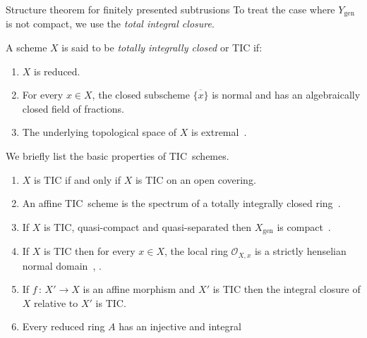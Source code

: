 \documentclass[a4paper,twoside,11pt]{amsart}[2009/07/02] %
\newcommand{\map}[3]{#1\,:\, #2\rightarrow #3}
\newcommand{\Spec}{\mathrm{Spec}}
\newcommand{\genpts}{\mathrm{gen}} %
\newcommand\sO{\mathcal{O}} %
\newcommand{\TIC}{\mathrm{TIC}}
\begin{document}
\begin{section}{Structure theorem for finitely presented subtrusions}
To treat
%
the case where $Y_\genpts$ is not compact, we use
the \emph{total integral closure}.

\begin{definition}\label{D:TIC}
A scheme $X$ is said to be \emph{totally integrally closed} or TIC if:
%
\begin{enumerate}
\item $X$ is reduced.
\item For every $x\in X$, the closed subscheme $\overline{\{x\}}$ is
normal and has an algebraically closed field of fractions.
\item The underlying topological space of $X$ is
  extremal~\cite[\S2]{hochster_TIC}.
\end{enumerate}
%
\end{definition}

\begin{properties}\label{X:TIC}
We briefly list the basic properties of TIC~schemes.
%
\begin{enumerate}
\item $X$ is TIC if and only if $X$ is TIC on an open covering.
%
\item An affine TIC~scheme is the spectrum of a totally integrally closed
ring~\cite[Thm.~1]{hochster_TIC}.
%
\item If $X$ is TIC, quasi-compact and quasi-separated then $X_\genpts$ is
compact~\cite[Prop.~5]{hochster_TIC}.
%
\item If $X$ is TIC then for every $x\in X$, the local ring $\sO_{X,x}$ is
a strictly henselian normal domain~\cite[Prop.~7]{hochster_TIC},
\cite[Prop.~1.4]{artin_Hensel-join}.
%
%
%
\item If $\map{f}{X'}{X}$ is an affine morphism and $X'$ is TIC then
the integral closure of $X$ relative to $X'$ is TIC.\label{XTIC:IC-in-TIC}
%
\item Every reduced ring $A$ has an injective and integral

\end{enumerate}
\end{properties}
\end{section}
\end{document}
